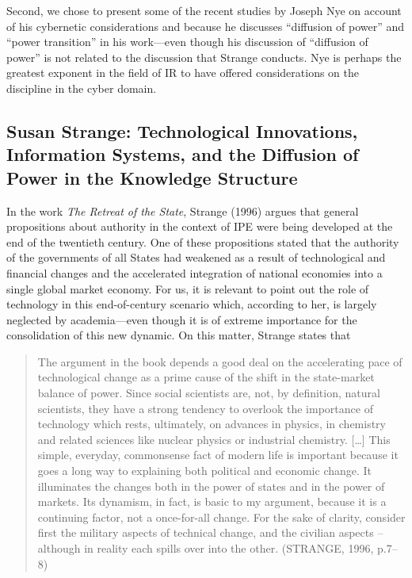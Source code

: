 Second, we chose to present some of the recent studies by Joseph Nye on account of his cybernetic considerations and because he discusses ``diffusion of power'' and ``power transition'' in his work---even though his discussion of ``diffusion of power'' is not related to the discussion that Strange conducts. Nye is perhaps the greatest exponent in the field of IR to have offered considerations on the discipline in the cyber domain.

\subsection{Susan Strange: Technological Innovations, Information Systems, and the Diffusion of Power in the Knowledge Structure}

In the work \textit{The Retreat of the State}, Strange (1996) argues that general propositions about authority in the context of IPE were being developed at the end of the twentieth century. One of these propositions stated that the authority of the governments of all States had weakened as a result of technological and financial changes and the accelerated integration of national economies into a single global market economy. For us, it is relevant to point out the role of technology in this end-of-century scenario which, according to her, is largely neglected by academia---even though it is of extreme importance for the consolidation of this new dynamic. On this matter, Strange states that

\begin{quote}
The argument in the book depends a good deal on the accelerating pace of technological change as a prime cause of the shift in the state-market balance of power. Since social scientists are, not, by definition, natural scientists, they have a strong tendency to overlook the importance of technology which rests, ultimately, on advances in physics, in chemistry and related sciences like nuclear physics or industrial chemistry. {[}\ldots{]} This simple, everyday, commonsense fact of modern life is important because it goes a long way to explaining both political and economic change. It illuminates the changes both in the power of states and in the power of markets. Its dynamism, in fact, is basic to my argument, because it is a continuing factor, not a once-for-all change. For the sake of clarity, consider first the military aspects of technical change, and the civilian aspects -- although in reality each spills over into the other. (STRANGE, 1996, p.7--8)
\end{quote}

